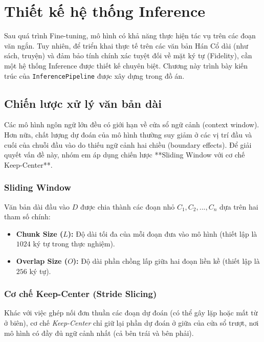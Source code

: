 \chapter{Thiết kế hệ thống Inference}
\label{chap:inference}

Sau quá trình Fine-tuning, mô hình có khả năng thực hiện tác vụ trên các đoạn văn ngắn. Tuy nhiên, để triển khai thực tế trên các văn bản Hán Cổ dài (như sách, truyện) và đảm bảo tính chính xác tuyệt đối về mặt ký tự (Fidelity), cần một hệ thống Inference được thiết kế chuyên biệt. Chương này trình bày kiến trúc của \texttt{InferencePipeline} được xây dựng trong đồ án.

\section{Chiến lược xử lý văn bản dài}

Các mô hình ngôn ngữ lớn đều có giới hạn về cửa sổ ngữ cảnh (context window). Hơn nữa, chất lượng dự đoán của mô hình thường suy giảm ở các vị trí đầu và cuối của chuỗi đầu vào do thiếu ngữ cảnh hai chiều (boundary effects). Để giải quyết vấn đề này, nhóm em áp dụng chiến lược **Sliding Window với cơ chế Keep-Center**.

\subsection{Sliding Window}
Văn bản dài đầu vào $D$ được chia thành các đoạn nhỏ $C_1, C_2, ..., C_n$ dựa trên hai tham số chính:
\begin{itemize}
    \item \textbf{Chunk Size ($L$):} Độ dài tối đa của mỗi đoạn đưa vào mô hình (thiết lập là $1024$ ký tự trong thực nghiệm).
    \item \textbf{Overlap Size ($O$):} Độ dài phần chồng lấp giữa hai đoạn liền kề (thiết lập là $256$ ký tự).
\end{itemize}

\subsection{Cơ chế Keep-Center (Stride Slicing)}
Khác với việc ghép nối đơn thuần các đoạn dự đoán (có thể gây lặp hoặc mất từ ở biên), cơ chế \textit{Keep-Center} chỉ giữ lại phần dự đoán ở giữa của cửa sổ trượt, nơi mô hình có đầy đủ ngữ cảnh nhất (cả bên trái và bên phải).

